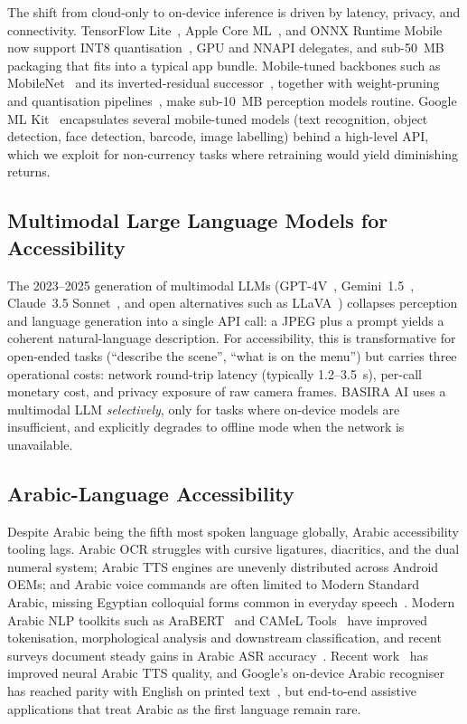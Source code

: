 \documentclass[11pt,a4paper]{article}
\begin{document}
The shift from cloud-only to on-device inference is driven by latency,
privacy, and connectivity. TensorFlow Lite~\cite{tflite}, Apple Core
ML~\cite{coreml}, and ONNX Runtime Mobile~\cite{onnx_runtime} now support
INT8 quantisation~\cite{jacob_int8}, GPU and NNAPI delegates,
and sub-50~MB packaging that fits into a typical app bundle. Mobile-tuned
backbones such as MobileNet~\cite{howard_mobilenets} and its inverted-residual
successor~\cite{sandler_mobilenetv2}, together with weight-pruning and
quantisation pipelines~\cite{han_deep_compression}, make sub-10~MB perception
models routine. Google ML
Kit~\cite{mlkit} encapsulates several mobile-tuned models (text recognition,
object detection, face detection, barcode, image labelling) behind a
high-level API, which we exploit for non-currency tasks where retraining
would yield diminishing returns.

\subsection{Multimodal Large Language Models for Accessibility}

The 2023--2025 generation of multimodal LLMs (GPT-4V~\cite{gpt4v},
Gemini~1.5~\cite{gemini_tech_report}, Claude~3.5
Sonnet~\cite{claude3}, and open alternatives such as LLaVA~\cite{llava})
collapses perception and language generation into a single API
call: a JPEG plus a prompt yields a coherent natural-language description.
For accessibility, this is transformative for open-ended tasks (``describe
the scene'', ``what is on the menu'') but carries three operational costs:
network round-trip latency (typically 1.2--3.5~s), per-call monetary cost,
and privacy exposure of raw camera frames. BASIRA AI uses a multimodal LLM
\emph{selectively}, only for tasks where on-device models are insufficient,
and explicitly degrades to offline mode when the network is unavailable.

\subsection{Arabic-Language Accessibility}

Despite Arabic being the fifth most spoken language globally, Arabic
accessibility tooling lags. Arabic OCR struggles with cursive ligatures,
diacritics, and the dual numeral system; Arabic TTS engines are unevenly
distributed across Android OEMs; and Arabic voice commands are often
limited to Modern Standard Arabic, missing Egyptian colloquial forms common
in everyday speech~\cite{arabic_dialect_survey}. Modern Arabic NLP toolkits
such as AraBERT~\cite{arabert} and CAMeL Tools~\cite{camel_tools} have
improved tokenisation, morphological analysis and downstream classification,
and recent surveys document steady gains in Arabic ASR
accuracy~\cite{arabic_asr_review}. Recent work~\cite{arabic_tts_survey} has
improved
neural Arabic TTS quality, and Google's on-device Arabic recogniser has
reached parity with English on printed text~\cite{mlkit_ar}, but
end-to-end assistive applications that treat Arabic as the first language
remain rare.
\end{document}
